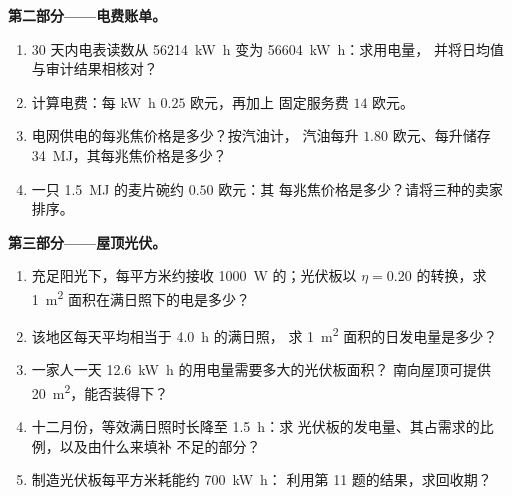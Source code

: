 \begin{problem}
\medskip
\noindent\textbf{第二部分——电费账单。}
\begin{enumerate}[resume]
  \item 30 天内电表读数从 \qty{56214}{kW.h} 变为
        \qty{56604}{kW.h}：求用电量，
        并将日均值与审计结果相核对？
  \item 计算电费：每 \unit{kW.h} $0.25$ 欧元，再加上
        固定服务费 $14$ 欧元。
  \item 电网供电的每兆焦价格是多少？按汽油计，
        汽油每升 $1.80$ 欧元、每升储存 \qty{34}{MJ}，其每兆焦价格是多少？
  \item 一只 \qty{1.5}{MJ} 的麦片碗约 $0.50$ 欧元：其
        每兆焦价格是多少？请将三种的卖家排序。
\end{enumerate}

\medskip
\noindent\textbf{第三部分——屋顶光伏。}
\begin{enumerate}[resume]
  \item 充足阳光下，每平方米约接收 \qty{1000}{W}
        的；光伏板以 $\eta = 0.20$ 的转换，求
        \qty{1}{m^2} 面积在满日照下的电是多少？
  \item 该地区每天平均相当于 \qty{4.0}{h} 的满日照，
        求 \qty{1}{m^2} 面积的日发电量是多少？
  \item 一家人一天 \qty{12.6}{kW.h} 的用电量需要多大的光伏板面积？
        南向屋顶可提供 \qty{20}{m^2}，能否装得下？
  \item 十二月份，等效满日照时长降至 \qty{1.5}{h}：求
        光伏板的发电量、其占需求的比例，以及由什么来填补
        不足的部分？
  \item 制造光伏板每平方米耗能约 \qty{700}{kW.h}：
        利用第 11 题的结果，求回收期？
\end{enumerate}


\end{problem}
